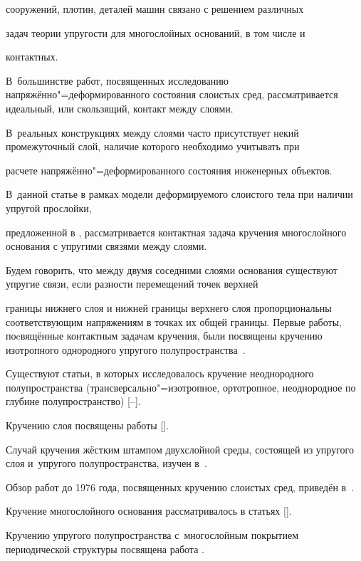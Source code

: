 сооружений, плотин, деталей машин связано с решением различных

задач теории упругости для многослойных оснований, в том числе и

контактных. 

В~большинстве работ,  посвященных исследованию напряжённо"=деформированного состояния  слоистых сред, рассматривается идеальный,  или скользящий, контакт между слоями. 

В~реальных конструкциях между слоями часто присутствует некий промежуточный слой, наличие которого необходимо учитывать при

расчете напряжённо"=деформированного состояния инженерных объектов. 

В~данной статье в рамках модели деформируемого слоистого тела при наличии упругой прослойки,

предложенной в \cite{antvel:bib:Jones-ru}, рассматривается контактная задача кручения многослойного основания с упругими связями между слоями. 

Будем говорить, что между двумя соседними слоями основания существуют упругие связи, если разности перемещений точек верхней

границы нижнего слоя и нижней границы верхнего слоя пропорциональны соответствующим напряжениям в точках их общей границы. Первые работы, поcвящённые контактным задачам кручения, были посвящены кручению  изотропного однородного упругого полупространства~\cite{antvel:bib:Reissner-ru,antvel:bib:Borodachev-ru}. 

Существуют статьи, в которых исследовалось кручение неоднородного полупространства (трансверсально"=изотропное, ортотропное, неоднородное по глубине полупространство) [--]. 

Кручению слоя посвящены работы []. 

Случай кручения жёстким штампом  двухслойной среды, состоящей из упругого слоя и~упругого полупространства, изучен в~\cite{antvel:bib:Gril-ru}.

Обзор работ до 1976 года, посвященных кручению слоистых сред, приведён в~\cite{antvel:bib:Galin-ru}. 

Кручение многослойного основания рассматривалось в статьях []. 

Кручению упругого полупространства с~многослойным покрытием периодической структуры посвящена работа \cite{antvel:bib:VasSadVas-ru}. 

